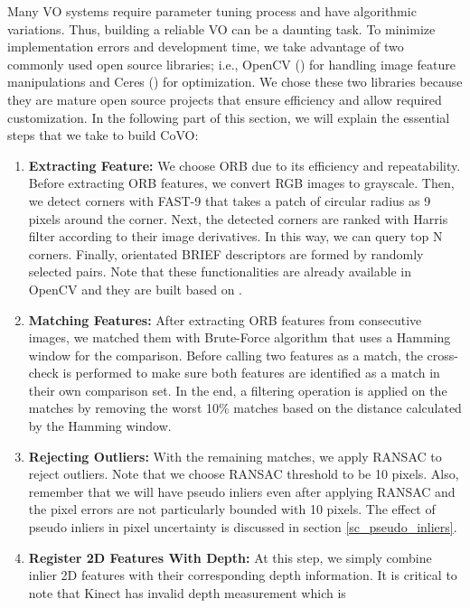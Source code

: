 \documentclass[a4paper]{report}
\numberwithin{figure}{section}
\begin{document}
Many VO systems require parameter tuning process and have algorithmic
variations.  Thus, building a reliable VO can be a daunting task.  To minimize
implementation errors and development time, we take advantage of two commonly
used open source libraries; i.e., OpenCV (\parencite{opencv}) for handling 
image
feature manipulations and Ceres (\parencite{ceres-solver}) for optimization. We
chose these two libraries because they are mature open source projects that
ensure efficiency and allow required customization.  In the following part of
this section, we will explain the essential steps that we take to build CoVO:


\begin{enumerate} 
  \item \textbf{Extracting Feature:} We choose ORB due to its efficiency and
    repeatability. Before extracting ORB features, we convert RGB images to
    grayscale. Then, we detect corners with FAST-9 that takes a patch of
    circular radius as 9 pixels around the corner. Next, the detected corners
    are ranked with Harris filter according to their image derivatives. In this
    way, we can query top N corners.  Finally, orientated BRIEF descriptors are
    formed by randomly selected pairs.  Note that these functionalities are
    already available in OpenCV and they are built based on 
    \parencite{Rublee2011a}.  
  \item \textbf{Matching Features:} After extracting ORB features from
    consecutive images, we matched them with Brute-Force algorithm that uses
    a Hamming window for the comparison. Before calling two features as a 
    match,
    the cross-check is performed to make sure both features are identified as a
    match in their own comparison set.  In the end, a filtering operation is
    applied on the matches by removing the worst 10\% matches based on the 
    distance
    calculated by the Hamming window.
  \item \textbf{Rejecting Outliers:} With the remaining matches, we apply
    RANSAC to reject outliers. Note that we choose RANSAC threshold to be 10
    pixels. Also, remember that we will have pseudo inliers even after applying
    RANSAC and the pixel errors are not particularly bounded with 10 pixels.
    The effect of pseudo inliers in pixel uncertainty is discussed in section
    \ref{sc_pseudo_inliers}.
  \item \textbf{Register 2D Features With Depth:} At this step, we simply
    combine inlier 2D features with their corresponding depth information. It
    is critical to note that Kinect has invalid depth measurement which is

\end{enumerate}
\end{document}
